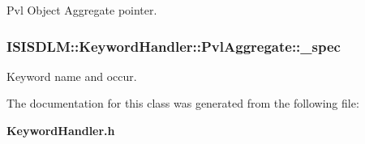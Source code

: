 Pvl Object Aggregate pointer. 

\subsubsection{ {\bf ISISDLM::Keyword\-Handler::Pvl\-Aggregate::\_\-spec}\hspace{0.3cm}{\tt  [private]}}\label{classISISDLM_1_1KeywordHandler_1_1PvlAggregate_r0}


Keyword name and occur. 



The documentation for this class was generated from the following file:\begin{CompactItemize}
\item 
{\bf Keyword\-Handler.h}\end{CompactItemize}
